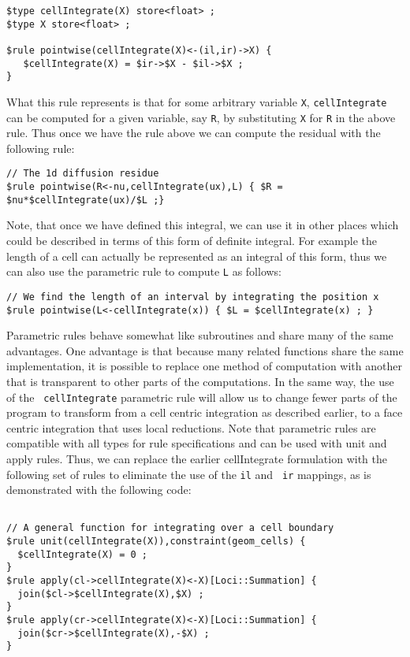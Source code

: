 \documentclass[10pt,epsf,letterpaper,twoside]{book}
\begin{document}
\begin{verbatim}
$type cellIntegrate(X) store<float> ;
$type X store<float> ;

$rule pointwise(cellIntegrate(X)<-(il,ir)->X) {
   $cellIntegrate(X) = $ir->$X - $il->$X ;
}
\end{verbatim}

What this rule represents is that for some arbitrary variable {\tt X},
{\tt cellIntegrate} can be computed for a given variable, say {\tt R},
by substituting {\tt X} for {\tt R} in the above rule.  Thus once we
have the rule above we can compute the residual with the following rule:

\begin{verbatim}
// The 1d diffusion residue
$rule pointwise(R<-nu,cellIntegrate(ux),L) { $R = $nu*$cellIntegrate(ux)/$L ;}
\end{verbatim}

Note, that once we have defined this integral, we can use it in other
places which could be described in terms of this form of definite
integral.  For example the length of a cell can actually be
represented as an integral of this form, thus we can also use the
parametric rule to compute {\tt L} as follows:

\begin{verbatim}
// We find the length of an interval by integrating the position x
$rule pointwise(L<-cellIntegrate(x)) { $L = $cellIntegrate(x) ; }
\end{verbatim}
Parametric rules behave somewhat like subroutines and share many of
the same advantages.  One advantage is that because many related
functions share the same implementation, it is possible to replace one
method of computation with another that is transparent to other parts
of the computations.  In the same way, the use of the {\tt
  cellIntegrate} parametric rule will allow us to change fewer parts
of the program to transform from a cell centric integration as
described earlier, to a face centric integration that uses local
reductions.  Note that parametric rules are compatible with all types
for rule specifications and can be used with unit and apply rules.
Thus, we can replace the earlier cellIntegrate formulation with the
following set of rules to eliminate the use of the {\tt il} and {\tt
  ir} mappings, as is demonstrated with the following code:

\begin{verbatim}

// A general function for integrating over a cell boundary
$rule unit(cellIntegrate(X)),constraint(geom_cells) {
  $cellIntegrate(X) = 0 ;
}
$rule apply(cl->cellIntegrate(X)<-X)[Loci::Summation] {
  join($cl->$cellIntegrate(X),$X) ;
}
$rule apply(cr->cellIntegrate(X)<-X)[Loci::Summation] {
  join($cr->$cellIntegrate(X),-$X) ;
}
\end{verbatim}
\end{document}
